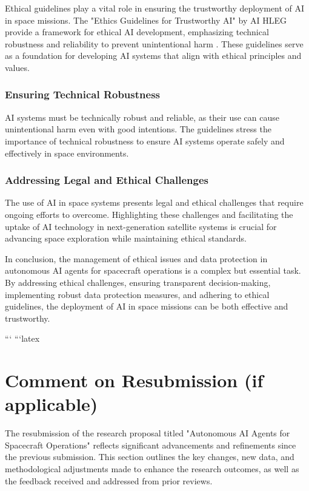 \documentclass[a4paper, 11pt]{article}
\begin{document}
Ethical guidelines play a vital role in ensuring the trustworthy deployment of AI in space missions. The "Ethics Guidelines for Trustworthy AI" by AI HLEG provide a framework for ethical AI development, emphasizing technical robustness and reliability to prevent unintentional harm \cite{344}. These guidelines serve as a foundation for developing AI systems that align with ethical principles and values.

\subsubsection{Ensuring Technical Robustness}

AI systems must be technically robust and reliable, as their use can cause unintentional harm even with good intentions. The guidelines stress the importance of technical robustness to ensure AI systems operate safely and effectively in space environments.

\subsubsection{Addressing Legal and Ethical Challenges}

The use of AI in space systems presents legal and ethical challenges that require ongoing efforts to overcome. Highlighting these challenges and facilitating the uptake of AI technology in next-generation satellite systems is crucial for advancing space exploration while maintaining ethical standards.

In conclusion, the management of ethical issues and data protection in autonomous AI agents for spacecraft operations is a complex but essential task. By addressing ethical challenges, ensuring transparent decision-making, implementing robust data protection measures, and adhering to ethical guidelines, the deployment of AI in space missions can be both effective and trustworthy.



```
```latex
\section{Comment on Resubmission (if applicable)}

The resubmission of the research proposal titled "Autonomous AI Agents for Spacecraft Operations" reflects significant advancements and refinements since the previous submission. This section outlines the key changes, new data, and methodological adjustments made to enhance the research outcomes, as well as the feedback received and addressed from prior reviews.
\end{document}
